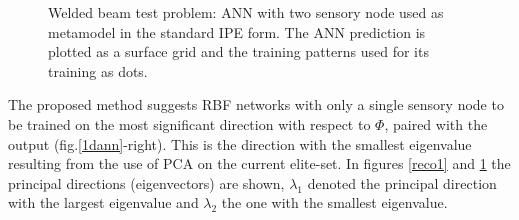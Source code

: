 \begin{figure}[h!]
\begin{minipage}[b]{1\linewidth}
 \centering
\end{minipage}
\caption{Welded beam test problem: ANN with two sensory node used as metamodel in the standard IPE form. The ANN prediction is plotted as a surface grid and the training patterns used for its training as dots.} 
\label{2dann}
\end{figure}

The proposed method suggests RBF networks with only a single sensory node to be trained on the most significant direction with respect to $\Phi$, paired with the output (fig.\ref{1dann}-right). This is the direction with the smallest eigenvalue resulting from the use of PCA on the current elite-set. In figures \ref{reco1} and \ref{2dann} the principal directions (eigenvectors) are shown, $\lambda_1$ denoted the principal direction with the largest eigenvalue and $\lambda_2$ the one with the smallest eigenvalue.   

